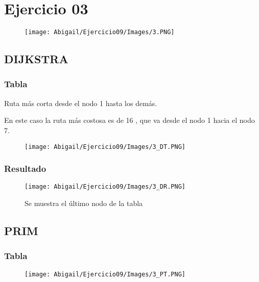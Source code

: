 \documentclass[12pt]{article}
\begin{document}
  \section{Ejercicio 03}
    \begin{figure}[h!]
      \centering
      \texttt{[image: Abigail/Ejercicio09/Images/3.PNG]}
    \end{figure} 

    \subsection{DIJKSTRA}
      \subsubsection{Tabla}
        Ruta más corta desde el nodo 1 hasta los demás.
        
        En este caso la ruta más costosa es de 16 , que va desde el nodo 1 hacia el nodo 7.
      
        \begin{figure}[h!]
          \centering
          \texttt{[image: Abigail/Ejercicio09/Images/3\_DT.PNG]}
          
        \end{figure} 
\newpage
      \subsubsection{Resultado}
        \begin{figure}[h!]
          \centering
          \texttt{[image: Abigail/Ejercicio09/Images/3\_DR.PNG]}
          \caption{Se muestra el último nodo de la tabla}
        \end{figure} 

    \subsection{PRIM}

      \subsubsection{Tabla}

        \begin{figure}[h!]
          \centering
          \texttt{[image: Abigail/Ejercicio09/Images/3\_PT.PNG]}
        \end{figure} 
        
\end{document}
